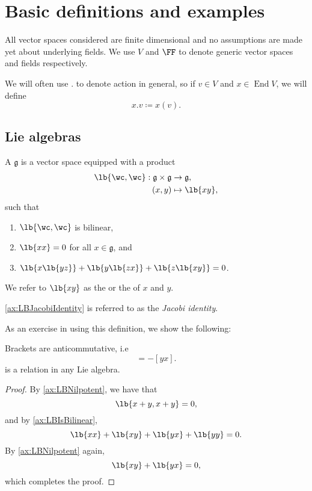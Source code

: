 \documentclass{article}
\DeclarePairedDelimiter\lb\lbrack\rbrack
\DeclareMathOperator{\End}{End}
\newcommand*\frkg{{\ensuremath{\mathfrak{g}}}}
\newcommand*\acts{.}
\begin{document}
\newpage

\section{Basic definitions and examples}

\begin{convention}
    All vector spaces considered are finite dimensional and no assumptions are made yet about underlying fields.
    We use $V$ and $\FF$ to denote generic vector spaces and fields respectively.

    We will often use $\acts$ to denote action in general, so if $v \in V$ and $x \in \End V$, we will define
    \[
        x \acts v
        \coloneq
        x(v).
    \]
\end{convention}

\subsection{Lie algebras}

\begin{definition}
    A  $\frkg$ is a vector space equipped with a product
    \begin{align*}
        \lb{\wc,\wc}: \frkg \times \frkg
        &\to
        \frkg,
        \\
        (x,y)
        &\mapsto
        \lb{xy},
    \end{align*}
    such that
    \begin{enumerate}[label=(L\arabic*)]
        \item 
            \label{ax:LBIsBilinear}
            $\lb{\wc,\wc}$ is bilinear,
        \item 
            \label{ax:LBNilpotent}
            $\lb{xx} = 0$ for all $x \in \frkg$, and
        \item 
            \label{ax:LBJacobiIdentity}
            $\lb{x\lb{yz}} + \lb{y\lb{zx}} + \lb{z\lb{xy}} = 0$.
    \end{enumerate}
    We refer to $\lb{xy}$ as the  or the  of $x$ and $y$.
\end{definition}

\ref{ax:LBJacobiIdentity} is referred to as the \textit{Jacobi identity}.

As an exercise in using this definition, we show the following:

\begin{proposition}
    Brackets are anticommutative, i.e
    \begin{equation}
        [xy]
        =
        -[yx].
        \tag{L2'}
    \end{equation}
    is a relation in any Lie algebra.
\end{proposition}
\begin{proof}
    By \ref{ax:LBNilpotent}, we have that
    \[
        \lb{x+y,x+y}
        =
        0,
    \]
    and by \ref{ax:LBIsBilinear},
    \[
        \lb{xx} + \lb{xy} + \lb{yx} + \lb{yy}
        =
        0.
    \]
    By \ref{ax:LBNilpotent} again,
    \[
        \lb{xy} + \lb{yx}
        =
        0,
    \]
    which completes the proof.
\end{proof}
\end{document}
